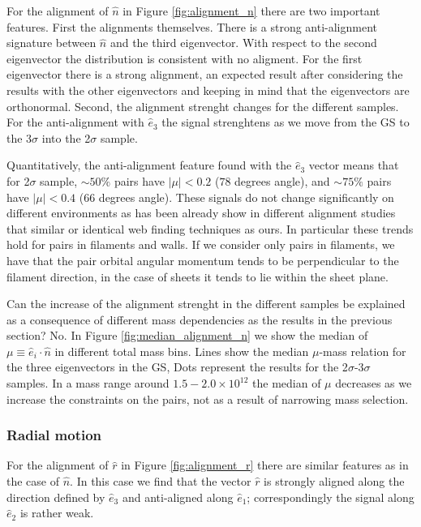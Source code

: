 \documentclass{emulateapj}
\newcommand{\msun}{{\ifmmode{{\rm {M_{\odot}}}}\else{${\rm{M_{\odot}}}$}\fi}}
\begin{document}
For the alignment of $\hat{n}$ in Figure \ref{fig:alignment_n} there
are two important features.
First the alignments themselves. 
There is a strong anti-alignment signature between $\hat{n}$ and the
third eigenvector. 
With respect to the second eigenvector the distribution is consistent
with no aligment. 
For the first eigenvector there is a strong alignment, an expected
result after considering the results with the other eigenvectors and
keeping in mind that the eigenvectors are orthonormal.
Second, the alignment strenght changes for the different samples. 
For the anti-alignment with $\hat{e}_3$ the signal strenghtens as we
move from the GS to the 3$\sigma$ into the 2$\sigma$ sample.

Quantitatively, the anti-alignment feature found with the $\hat{e}_3$ 
vector means that for 2$\sigma$ sample, $\sim 50\%$ pairs have
$|\mu|<0.2$ ($78$ degrees angle), and $\sim 75\%$ pairs have $|\mu|<0.4$
($66$ degrees angle). 
These signals do not change significantly on
different environments as has been already show in different alignment
studies that similar \citep{Libeskind2013} or identical
\citep{ForeroRomero2014} web finding techniques as ours.
In particular  these trends hold for pairs in filaments and walls.
If we consider only pairs in filaments, we have that the pair orbital
angular momentum tends to be perpendicular to the filament direction,
in the case of sheets it tends to lie within the sheet plane.

Can the increase of the alignment strenght in the different samples be
explained as a consequence of different mass dependencies as the
results in the previous section? No. 
In Figure \ref{fig:median_alignment_n} we show the median of
$\mu\equiv\hat{e}_i\cdot\hat{n}$ in different total mass bins.
Lines show the median $\mu$-mass relation for the three 
eigenvectors in the GS, Dots represent the results for the
2$\sigma$-3$\sigma$ samples. 
In a mass range around $1.5-2.0 \times 10^{12}$ \msun the median of
$\mu$ decreases as we increase the constraints on the pairs, not as a
result of narrowing mass selection. 

\subsubsection{Radial motion}


For the alignment of $\hat{r}$ in Figure \ref{fig:alignment_r} there
are similar features as in the case of $\hat{n}$. 
In this case we find that the vector $\hat{r}$
is strongly aligned along the direction defined by
$\hat{e}_3$ and anti-aligned along $\hat{e}_1$; correspondingly the
signal along $\hat{e}_2$ is rather weak. 
\end{document}
